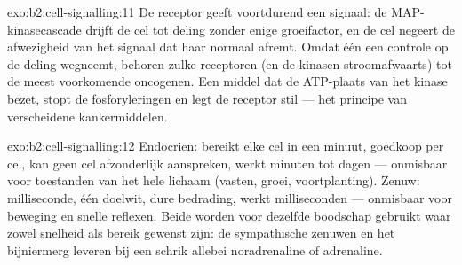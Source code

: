 \begin{solution}{exo:b2:cell-signalling:11}
De receptor geeft voortdurend een signaal: de MAP-kinasecascade drijft de cel
tot deling zonder enige groeifactor, en de cel negeert de afwezigheid van het
signaal dat haar normaal afremt. Omdat één  een controle op de deling
wegneemt, behoren zulke receptoren (en de kinasen stroomafwaarts) tot de
meest voorkomende oncogenen. Een middel dat de ATP-plaats van het kinase
bezet, stopt de fosforyleringen en legt de receptor stil --- het principe van
verscheidene kankermiddelen.
\end{solution}

\begin{solution}{exo:b2:cell-signalling:12}
Endocrien: bereikt elke cel in een minuut, goedkoop per cel, kan geen cel
afzonderlijk aanspreken, werkt minuten tot dagen --- onmisbaar voor toestanden
van het hele lichaam (vasten, groei, voortplanting). Zenuw: milliseconde, één
doelwit, dure bedrading, werkt milliseconden --- onmisbaar voor beweging en
snelle reflexen. Beide worden voor dezelfde boodschap gebruikt waar zowel
snelheid als bereik gewenst zijn: de sympathische zenuwen en het bijniermerg
leveren bij een schrik allebei noradrenaline of adrenaline.
\end{solution}

